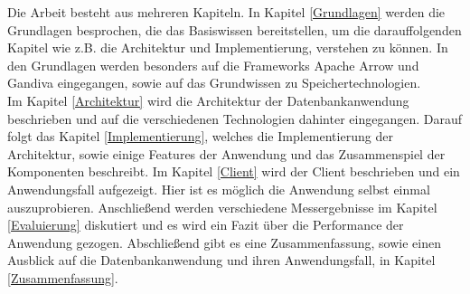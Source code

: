 Die Arbeit besteht aus mehreren Kapiteln. In Kapitel \ref{Grundlagen} werden die Grundlagen besprochen, die das Basiswissen bereitstellen, um die darauffolgenden Kapitel wie z.B. die Architektur und Implementierung, verstehen zu können.
In den Grundlagen werden besonders auf die Frameworks Apache Arrow und Gandiva eingegangen, sowie auf das Grundwissen zu Speichertechnologien.\\
Im Kapitel \ref{Architektur} wird die Architektur der Datenbankanwendung  beschrieben und auf die verschiedenen Technologien dahinter eingegangen. Darauf folgt das Kapitel \ref{Implementierung}, welches die Implementierung der Architektur, sowie einige Features der Anwendung und das Zusammenspiel der Komponenten beschreibt. 
Im Kapitel \ref{Client} wird der Client beschrieben und ein Anwendungsfall aufgezeigt. Hier ist es möglich die Anwendung selbst einmal auszuprobieren.
Anschließend werden verschiedene Messergebnisse im Kapitel \ref{Evaluierung} diskutiert und es wird ein Fazit über die Performance der Anwendung gezogen.
Abschließend gibt es eine Zusammenfassung, sowie einen Ausblick auf die Datenbankanwendung und ihren Anwendungsfall, in Kapitel \ref{Zusammenfassung}. 
  